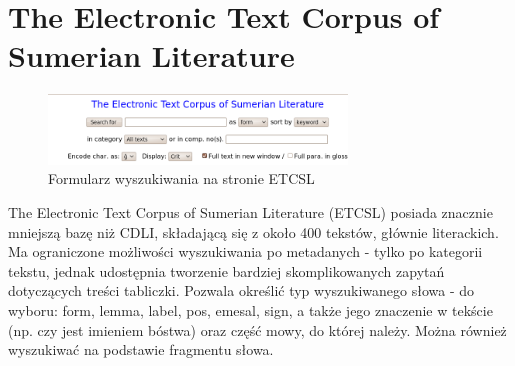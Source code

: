 \section{The Electronic Text Corpus of Sumerian Literature \cite{etcsl}}
\begin{figure}[h]
 \centering
 \includegraphics[width=300px]{../diagramy/etcsl-search.png}
 \caption{Formularz wyszukiwania na stronie ETCSL}
 \label{fig:etcsl-search}
\end{figure}

The Electronic Text Corpus of Sumerian Literature (ETCSL) posiada znacznie mniejszą bazę niż CDLI,
składającą się z około 400 tekstów, głównie literackich.
Ma ograniczone możliwości wyszukiwania po metadanych - tylko po kategorii tekstu,
jednak udostępnia tworzenie bardziej skomplikowanych zapytań dotyczących treści tabliczki.
Pozwala określić typ wyszukiwanego słowa - do wyboru: form, lemma, label, pos, emesal, sign,
a także jego znaczenie w tekście (np. czy jest imieniem bóstwa) oraz część mowy, do której należy.
Można również wyszukiwać na podstawie fragmentu słowa.

